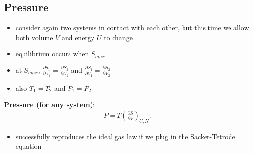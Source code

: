 \documentclass[10pt]{article}
\begin{document}
\subsection{Pressure}
\begin{itemize}
    \item consider again two systems in contact with each other, but this time we allow both volume $V$ and energy $U$ to change
    \item equilibrium occurs when $S_{max}$ 
    \item at $S_{max}$, $\frac{\partial S_1}{\partial U_1} = \frac{\partial S_2}{\partial U_2}$ and $\frac{\partial S_1}{\partial V_1} = \frac{\partial S_2}{\partial V_2}$
    \item also $T_1 = T_2$ and $P_1 = P_2$
\end{itemize}
\begin{definition}
    \textbf{Pressure (for any system)}:
    \begin{gather*}
        P = T \left( \frac{\partial S}{\partial V} \right)_{U,N}
    .\end{gather*}
    \begin{itemize}
        \item successfully reproduces the ideal gas law if we plug in the Sacker-Tetrode equation
    \end{itemize}
\end{definition}
\end{document}
